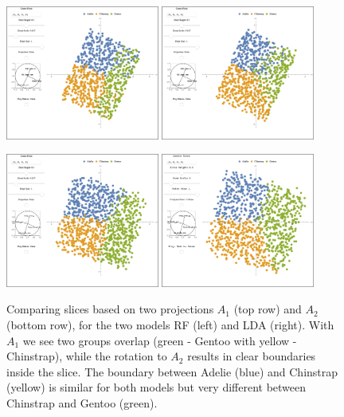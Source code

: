 \documentclass[]{interact}
\theoremstyle{plain}%
\theoremstyle{definition}
\theoremstyle{remark}
\begin{document}
\begin{figure}[ht]
\centerline{\includegraphics[width=0.45\textwidth]{figures/slice1_rf.png}
\includegraphics[width=0.45\textwidth]{figures/slice1_lda.png}}
\centerline{\includegraphics[width=0.45\textwidth]{figures/slice2_rf.png}
\includegraphics[width=0.45\textwidth]{figures/slice2_lda.png}}
\caption{Comparing slices based on two projections $A_1$ (top row) and $A_2$ (bottom row), for the two models RF (left) and LDA (right). With $A_1$ we see two groups overlap (green - Gentoo with yellow - Chinstrap), while the rotation to $A_2$ results in clear boundaries inside the slice. The boundary between Adelie (blue) and Chinstrap (yellow) is similar for both models but very different between Chinstrap and Gentoo (green).}
\label{slice1}
\end{figure}
\end{document}
